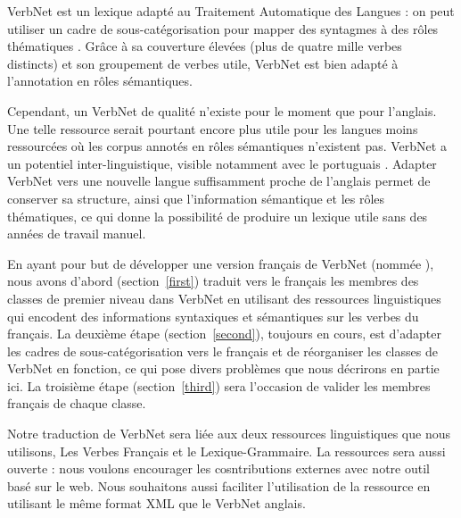 VerbNet est un lexique adapté au Traitement Automatique des Langues : on peut
utiliser un cadre de sous-catégorisation pour mapper des syntagmes à des rôles
thématiques \citep{swier2005exploiting,pradet2013revisiting}. Grâce à sa
couverture élevées (plus de quatre mille verbes distincts) et son groupement de
verbes utile, VerbNet est bien adapté à l'annotation en rôles sémantiques.

Cependant, un VerbNet de qualité n'existe pour le moment que pour l'anglais.
Une telle ressource serait pourtant encore plus utile pour les langues moins
ressourcées où les corpus annotés en rôles sémantiques n'existent pas. VerbNet
a un potentiel inter-linguistique, visible notamment avec le portuguais
\citep[section 2.2.2]{kipperschuler2005verbnet}. Adapter VerbNet vers une
nouvelle langue suffisamment proche de l'anglais permet de conserver sa
structure, ainsi que l'information sémantique et les rôles thématiques, ce qui
donne la possibilité de produire un lexique utile sans des années de travail
manuel.


En ayant pour but de développer une version français de VerbNet (nommée
\verbenet{}), nous avons d'abord (section~\ref{first}) traduit vers le français
les membres des classes de premier niveau dans VerbNet en utilisant des
ressources linguistiques qui encodent des informations syntaxiques et
sémantiques sur les verbes du français. La deuxième étape
(section~\ref{second}), toujours en cours, est d'adapter les cadres de
sous-catégorisation vers le français et de réorganiser les classes de VerbNet
en fonction, ce qui pose divers problèmes que nous décrirons en partie ici. La
troisième étape (section~\ref{third}) sera l'occasion de valider les membres
français de chaque classe.

Notre traduction de VerbNet sera liée aux deux ressources linguistiques que
nous utilisons, Les Verbes Français et le Lexique-Grammaire. La ressources sera
aussi ouverte : nous voulons encourager les cosntributions externes avec notre
outil basé sur le web. Nous souhaitons aussi faciliter l'utilisation de la
ressource en utilisant le même format XML que le VerbNet anglais.

